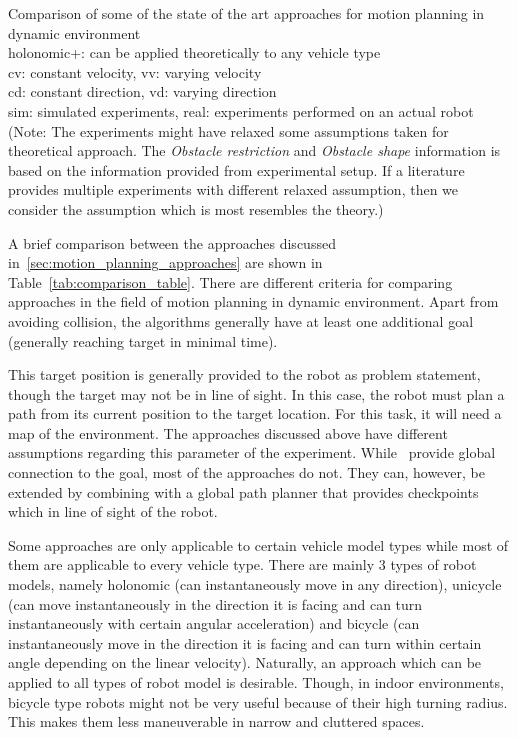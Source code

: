 \begin{table}[htpb]
    \caption{\label{tab:comparison_table}
    Comparison of some of the state of the art approaches for motion planning in dynamic environment\\
    holonomic+: can be applied theoretically to any vehicle type\\
    cv: constant velocity, vv: varying velocity\\ cd: constant direction, vd: varying direction\\
    sim: simulated experiments, real: experiments performed on an actual robot\\
    (Note: The experiments might have relaxed some assumptions taken for theoretical approach. 
    The \textit{Obstacle restriction} and \textit{Obstacle shape} information is based on the 
    information provided from experimental setup. If a literature provides multiple experiments 
    with different relaxed assumption, then we consider the assumption which is most resembles the theory.)
    }
\end{table}

A brief comparison between the approaches discussed in~\ref{sec:motion_planning_approaches} are shown in Table~\ref{tab:comparison_table}.
There are different criteria for comparing approaches in the field of motion planning  
in dynamic environment.
Apart from avoiding collision, the algorithms generally have at least one additional goal 
(generally reaching target in minimal time).

This target position is generally provided to the robot as problem statement, though the 
target may not be in line of sight. In this case, the robot must plan a path from its current 
position to the target location. For this task, it will need a map of the environment. 
The approaches discussed above have different assumptions regarding this parameter of 
the experiment. While~\cite{brock1999high, ogren2005convergent, seder2007dynamic,
chung2009safe,petti2005safe,hsu2002randomized,van2006anytime,ge2002dynamic} provide global 
connection to the goal, most of the approaches do not.  They can, however, be extended by 
combining with a global path planner that provides checkpoints which in line of sight of the robot.

Some approaches are only applicable to certain vehicle model types while most of them are 
applicable to every vehicle type.
There are mainly 3 types of robot models, namely holonomic (can instantaneously move in 
any direction), unicycle (can move instantaneously in the direction it is facing and can 
turn instantaneously with certain angular acceleration) and bicycle (can instantaneously 
move in the direction it is facing and can turn within certain angle depending on the linear 
velocity)\cite{hoy2015algorithms}.
Naturally, an approach which can be applied to all types of robot model is desirable. 
Though, in indoor environments, bicycle type robots might not be very useful because of 
their high turning radius. This makes them less maneuverable in narrow and cluttered spaces.

